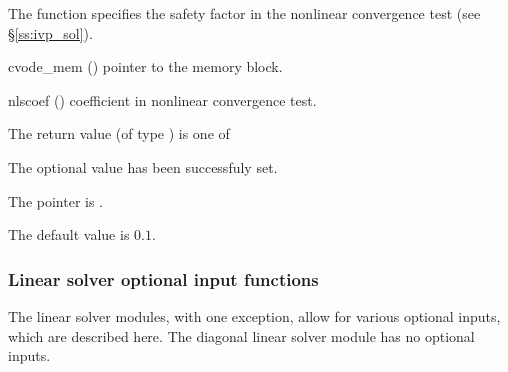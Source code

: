 {
  The function  specifies the safety factor
  in the nonlinear convergence test (see \S\ref{ss:ivp_sol}).
}
{
  \begin{args}
  \item[cvode\_mem] ()
    pointer to the {\cvode} memory block.
  \item[nlscoef] ()
    coefficient in nonlinear convergence test.
  \end{args}
}
{
  The return value  (of type ) is one of
  \begin{args}
  \item[\Id{SUCCESS}] 
    The optional value has been successfuly set.
  \item[\Id{CVS\_NO\_MEM}]
    The  pointer is .
  \end{args}
}
{
  The default value is $0.1$.
}
\subsubsection{Linear solver optional input functions}
The linear solver modules, with one exception, allow for various optional 
inputs, which are described here. The diagonal linear solver module has no
optional inputs.
